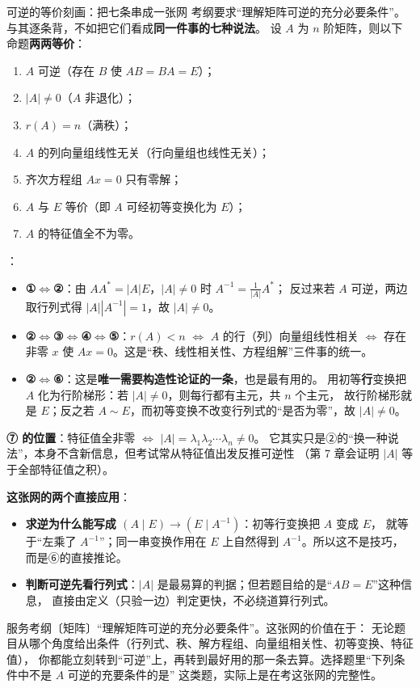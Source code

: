 \begin{fdeep}{可逆的等价刻画：把七条串成一张网}
考纲要求“理解矩阵可逆的充分必要条件”。与其逐条背，不如把它们看成\textbf{同一件事的七种说法}。
设 $A$ 为 $n$ 阶矩阵，则以下命题\textbf{两两等价}：
\begin{enumerate}[leftmargin=2.2em,itemsep=0.22em]
\item $A$ 可逆（存在 $B$ 使 $AB=BA=E$）；
\item $|A|\ne0$（$A$ 非退化）；
\item $r(A)=n$（满秩）；
\item $A$ 的列向量组线性无关（行向量组也线性无关）；
\item 齐次方程组 $Ax=0$ 只有零解；
\item $A$ 与 $E$ 等价（即 $A$ 可经初等变换化为 $E$）；
\item $A$ 的特征值全不为零。
\end{enumerate}

：
\begin{itemize}[leftmargin=2.2em,itemsep=0.25em]
\item \textbf{①$\Leftrightarrow$②}：由 $AA^{*}=|A|E$，$|A|\ne0$ 时 $A^{-1}=\frac1{|A|}A^{*}$；
      反过来若 $A$ 可逆，两边取行列式得 $|A||A^{-1}|=1$，故 $|A|\ne0$。
\item \textbf{②$\Leftrightarrow$③$\Leftrightarrow$④$\Leftrightarrow$⑤}：$r(A)<n$ $\iff$ $A$ 的行（列）向量组线性相关
      $\iff$ 存在非零 $x$ 使 $Ax=0$。这是“秩、线性相关性、方程组解”三件事的统一。
\item \textbf{②$\Leftrightarrow$⑥}：这是\textbf{唯一需要构造性论证的一条}，也是最有用的。
      用初等\textbf{行}变换把 $A$ 化为行阶梯形：若 $|A|\ne0$，则每行都有主元，共 $n$ 个主元，
      故行阶梯形就是 $E$；反之若 $A\sim E$，而初等变换不改变行列式的“是否为零”，故 $|A|\ne0$。
\end{itemize}
\textbf{⑦ 的位置}：特征值全非零 $\iff$ $|A|=\lambda_1\lambda_2\cdots\lambda_n\ne0$。
它其实只是②的“换一种说法”，本身不含新信息，但考试常从特征值出发反推可逆性
（第 7 章会证明 $|A|$ 等于全部特征值之积）。

\medskip
\textbf{这张网的两个直接应用}：
\begin{itemize}[leftmargin=2.2em,itemsep=0.22em]
\item \textbf{求逆为什么能写成 $(A\mid E)\to(E\mid A^{-1})$}：初等行变换把 $A$ 变成 $E$，
      就等于“左乘了 $A^{-1}$”；同一串变换作用在 $E$ 上自然得到 $A^{-1}$。所以这不是技巧，而是⑥的直接推论。
\item \textbf{判断可逆先看行列式}：$|A|$ 是最易算的判据；但若题目给的是“$AB=E$”这种信息，
      直接由定义（只验一边）判定更快，不必绕道算行列式。
\end{itemize}
\fbref{}服务考纲〔矩阵〕“理解矩阵可逆的充分必要条件”。这张网的价值在于：
无论题目从哪个角度给出条件（行列式、秩、解方程组、向量组相关性、初等变换、特征值），
你都能立刻转到“可逆”上，再转到最好用的那一条去算。选择题里“下列条件中不是 $A$ 可逆的充要条件的是”
这类题，实际上是在考这张网的完整性。
\end{fdeep}

